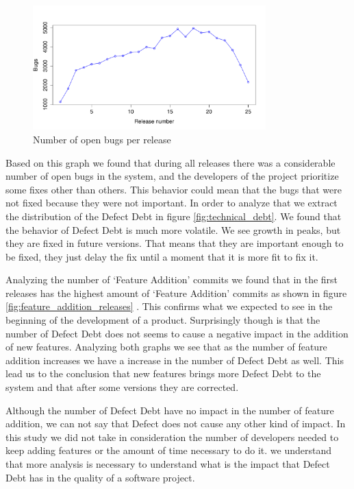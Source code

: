 \begin{figure}[thb!]
	\caption{Number of open bugs per release}
	\label{fig:number_of_bugs_releases}
	\includegraphics[width=90mm,scale=0.5]{figures/number_of_bugs_releases}
\end{figure}
  
Based on this graph we found that during all releases there was a considerable number of open bugs in the system, and the developers of the project prioritize some fixes other than others. This behavior could mean that the bugs that were not fixed because they were not important. In order to analyze that we extract the distribution of the Defect Debt in figure \ref{fig:technical_debt}. We found that the behavior of Defect Debt is much more volatile. We see growth in peaks, but they are fixed in future versions. That means that they are important enough to be fixed, they just delay the fix until a moment that it is more fit to fix it.

Analyzing the number of `Feature Addition' commits we found that in the first releases has the highest amount of `Feature Addition' commits as shown in figure \ref{fig:feature_addition_releases} . This confirms what we expected to see in the beginning of the development of a product. Surprisingly though is that the number of Defect Debt does not seems to cause a negative impact in the addition of new features. Analyzing both graphs we see that as the number of feature addition increases we have a increase in the number of Defect Debt as well. This lead us to the conclusion that new features brings more Defect Debt to the system and that after some versions they are corrected. 

Although the number of Defect Debt have no impact in the number of feature addition, we can not say that Defect does not cause any other kind of impact. In this study we did not take in consideration the number of developers needed to keep adding features or the amount of time necessary to do it. we understand that more analysis is necessary to understand what is the impact that Defect Debt has in the quality of a software project.

